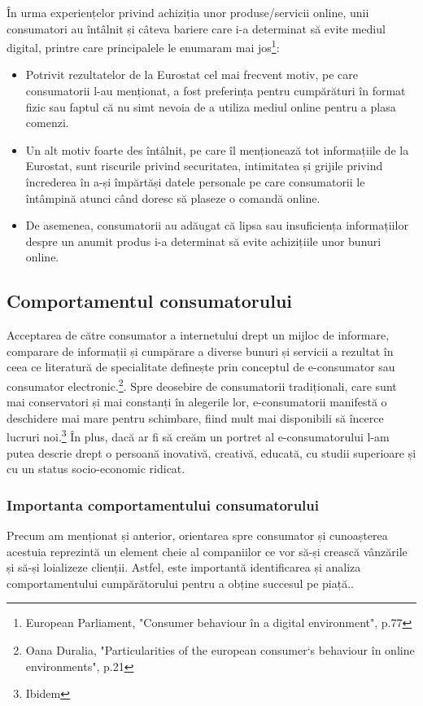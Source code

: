 \documentclass[a4paper, 12pt]{article}
\begin{document}
	\quad În urma experiențelor privind achiziția unor produse/servicii online, unii consumatori au întâlnit și câteva bariere care i-a determinat să evite mediul digital, printre care principalele le enumaram mai jos\footnote{European Parliament, "Consumer behaviour în a digital environment", p.77}:
	\begin{itemize}
	\item Potrivit rezultatelor de la Eurostat cel mai frecvent motiv, pe care consumatorii l-au menționat, a fost preferința pentru cumpărături în format fizic sau faptul că nu simt nevoia de a utiliza mediul online pentru a plasa comenzi.
	\item Un alt motiv foarte des întâlnit, pe care îl menționează tot informațiile de la Eurostat, sunt riscurile privind securitatea, intimitatea și grijile privind încrederea în a-și împărtăși datele personale pe care consumatorii le întâmpină atunci când doresc să plaseze o comandă online.
	\item De asemenea, consumatorii au adăugat că lipsa sau insuficiența informațiilor despre un anumit produs i-a determinat să evite achizițiile unor bunuri online.	
	\end{itemize}
\newpage
		\subsection{Comportamentul consumatorului}	
		\quad Acceptarea de către consumator a internetului drept un mijloc de informare, comparare de informații  și cumpărare a diverse bunuri și servicii a rezultat în ceea ce literatură de specialitate definește prin conceptul de e-consumator sau consumator electronic.\footnote{Oana Duralia, "Particularities of the european consumer`s behaviour în online environments", p.21}.  Spre deosebire de consumatorii tradiționali, care sunt mai conservatori și mai constanți în alegerile lor, e-consumatorii manifestă o deschidere mai mare pentru schimbare, fiind mult mai disponibili să încerce lucruri noi.\footnote{Ibidem} În plus, dacă ar fi să creăm un portret al e-consumatorului l-am putea descrie drept o persoană inovativă, creativă, educată, cu studii superioare și cu un status socio-economic ridicat.
			\subsubsection{Importanta comportamentului consumatorului }
		\quad Precum am menționat și anterior, orientarea spre consumator și cunoașterea acestuia reprezintă un element cheie al companiilor ce vor să-și crească vânzările și să-și loializeze clienții. Astfel, este importantă identificarea și analiza comportamentului cumpărătorului pentru a obține succesul pe piață..
		
\end{document}
